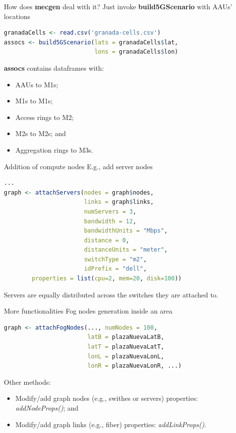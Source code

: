 \documentclass{beamer}
\begin{document}
\begin{frame}[fragile]{How does \textbf{mecgen} deal with it?}
    Just invoke \textbf{build5GScenario} with AAUs' locations

    \begin{lstlisting}[language=R]
granadaCells <- read.csv('granada-cells.csv')
assocs <- build5GScenario(lats = granadaCells$lat,
                          lons = granadaCells$lon)\end{lstlisting}

    \textbf{assocs} contains dataframes with:
    \begin{itemize}
        \item AAUs to M1s;
        \item M1s to M1s;
        \item Access rings to M2;
        \item M2s to M2s; and
        \item Aggregation rings to M3s.
    \end{itemize}
\end{frame}


\begin{frame}[fragile]{Addition of compute nodes}
    E.g., add server nodes
    \begin{lstlisting}[language=R]
...
graph <- attachServers(nodes = graph$nodes,
                       links = graph$links,
                       numServers = 3,
                       bandwidth = 12,
                       bandwidthUnits = "Mbps",
                       distance = 0,
                       distanceUnits = "meter",
                       switchType = "m2",
                       idPrefix = "dell",
        properties = list(cpu=2, mem=20, disk=100))
    \end{lstlisting}
    Servers are equally distributed across the switches they are attached to.
\end{frame}


\begin{frame}[fragile]{More functionalities}
    Fog nodes generation inside an area

    \begin{lstlisting}[language=R]
graph <- attachFogNodes(..., numNodes = 100,
                        latB = plazaNuevaLatB,
                        latT = plazaNuevaLatT,
                        lonL = plazaNuevaLonL,
                        lonR = plazaNuevaLonR, ...)\end{lstlisting}
    Other methods:
    \begin{itemize}
        \item Modify/add graph nodes (e.g., swithes or servers) properties: \emph{addNodeProps()}; and
        \item Modify/add graph links (e.g., fiber) properties: \emph{addLinkProps()}.
    \end{itemize}
\end{frame}
\end{document}
